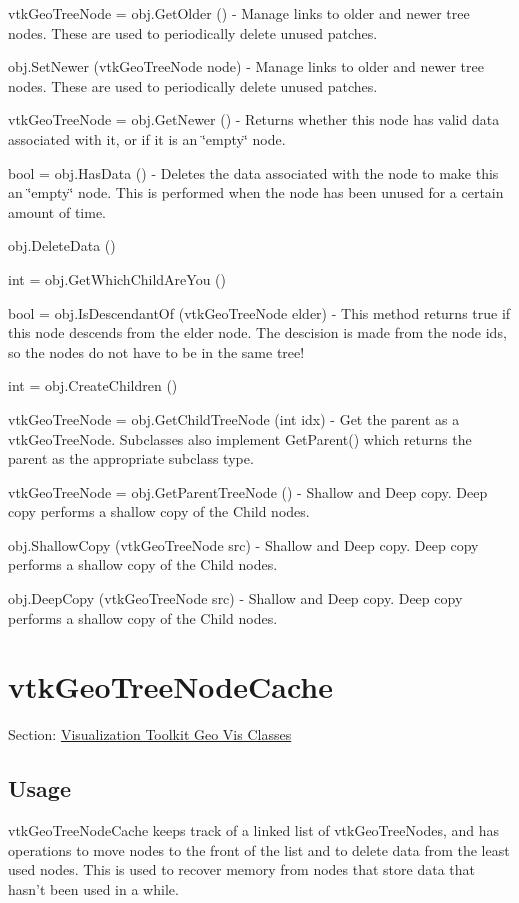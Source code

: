 \begin{DoxyItemize}
\item {\ttfamily vtk\-Geo\-Tree\-Node = obj.\-Get\-Older ()} -\/ Manage links to older and newer tree nodes. These are used to periodically delete unused patches.  
\item {\ttfamily obj.\-Set\-Newer (vtk\-Geo\-Tree\-Node node)} -\/ Manage links to older and newer tree nodes. These are used to periodically delete unused patches.  
\item {\ttfamily vtk\-Geo\-Tree\-Node = obj.\-Get\-Newer ()} -\/ Returns whether this node has valid data associated with it, or if it is an \char`\"{}empty\char`\"{} node.  
\item {\ttfamily bool = obj.\-Has\-Data ()} -\/ Deletes the data associated with the node to make this an \char`\"{}empty\char`\"{} node. This is performed when the node has been unused for a certain amount of time.  
\item {\ttfamily obj.\-Delete\-Data ()}  
\item {\ttfamily int = obj.\-Get\-Which\-Child\-Are\-You ()}  
\item {\ttfamily bool = obj.\-Is\-Descendant\-Of (vtk\-Geo\-Tree\-Node elder)} -\/ This method returns true if this node descends from the elder node. The descision is made from the node ids, so the nodes do not have to be in the same tree!  
\item {\ttfamily int = obj.\-Create\-Children ()}  
\item {\ttfamily vtk\-Geo\-Tree\-Node = obj.\-Get\-Child\-Tree\-Node (int idx)} -\/ Get the parent as a vtk\-Geo\-Tree\-Node. Subclasses also implement Get\-Parent() which returns the parent as the appropriate subclass type.  
\item {\ttfamily vtk\-Geo\-Tree\-Node = obj.\-Get\-Parent\-Tree\-Node ()} -\/ Shallow and Deep copy. Deep copy performs a shallow copy of the Child nodes.  
\item {\ttfamily obj.\-Shallow\-Copy (vtk\-Geo\-Tree\-Node src)} -\/ Shallow and Deep copy. Deep copy performs a shallow copy of the Child nodes.  
\item {\ttfamily obj.\-Deep\-Copy (vtk\-Geo\-Tree\-Node src)} -\/ Shallow and Deep copy. Deep copy performs a shallow copy of the Child nodes.  
\end{DoxyItemize}\hypertarget{vtkgeovis_vtkgeotreenodecache}{}\section{vtk\-Geo\-Tree\-Node\-Cache}\label{vtkgeovis_vtkgeotreenodecache}
Section\-: \hyperlink{sec_vtkgeovis}{Visualization Toolkit Geo Vis Classes} \hypertarget{vtkwidgets_vtkxyplotwidget_Usage}{}\subsection{Usage}\label{vtkwidgets_vtkxyplotwidget_Usage}
vtk\-Geo\-Tree\-Node\-Cache keeps track of a linked list of vtk\-Geo\-Tree\-Nodes, and has operations to move nodes to the front of the list and to delete data from the least used nodes. This is used to recover memory from nodes that store data that hasn't been used in a while.

